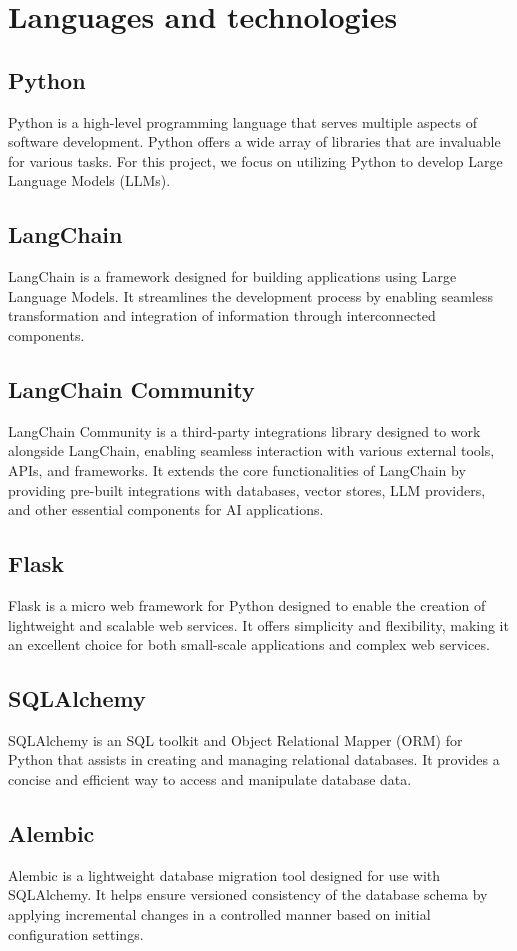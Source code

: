 \section{Languages and technologies}
    \subsection{Python}
    Python is a high-level programming language that serves multiple aspects of software development. Python offers a wide array of libraries that are invaluable for various tasks. For this project, we focus on utilizing Python to develop Large Language Models (LLMs).
    \subsection{LangChain}
    LangChain is a framework designed for building applications using Large Language Models. It streamlines the development process by enabling seamless transformation and integration of information through interconnected components.
    \subsection{LangChain Community}
    LangChain Community is a third-party integrations library designed to work alongside LangChain, enabling seamless interaction with various external tools, APIs, and frameworks. It extends the core functionalities of LangChain by providing pre-built integrations with databases, vector stores, LLM providers, and other essential components for AI applications.
    \subsection{Flask}
    Flask is a micro web framework for Python designed to enable the creation of lightweight and scalable web services. It offers simplicity and flexibility, making it an excellent choice for both small-scale applications and complex web services.
    \subsection{SQLAlchemy}
    SQLAlchemy is an SQL toolkit and Object Relational Mapper (ORM) for Python that assists in creating and managing relational databases. It provides a concise and efficient way to access and manipulate database data.
    \subsection{Alembic}
    Alembic is a lightweight database migration tool designed for use with SQLAlchemy. It helps ensure versioned consistency of the database schema by applying incremental changes in a controlled manner based on initial configuration settings.
